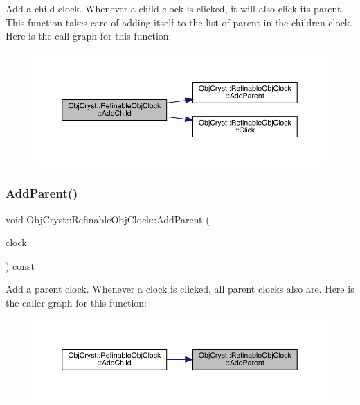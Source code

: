 Add a \textquotesingle{}child\textquotesingle{} clock. Whenever a child clock is clicked, it will also click its parent. This function takes care of adding itself to the list of parent in the children clock. Here is the call graph for this function\+:
\nopagebreak
\begin{figure}[H]
\begin{center}
\leavevmode
\includegraphics[width=350pt]{class_obj_cryst_1_1_refinable_obj_clock_a4be5b7b2f802d67000098a89939ffaf1_cgraph}
\end{center}
\end{figure}
\mbox{\label{class_obj_cryst_1_1_refinable_obj_clock_a56dadfe83111cdbc37da80cc19185e9a}} 
\subsubsection{\texorpdfstring{AddParent()}{AddParent()}}
{\footnotesize\ttfamily void Obj\+Cryst\+::\+Refinable\+Obj\+Clock\+::\+Add\+Parent (\begin{DoxyParamCaption}\item[{\mbox{\hyperlink{class_obj_cryst_1_1_refinable_obj_clock}{Refinable\+Obj\+Clock}} \&}]{clock }\end{DoxyParamCaption}) const}

Add a \textquotesingle{}parent\textquotesingle{} clock. Whenever a clock is clicked, all parent clocks also are. Here is the caller graph for this function\+:
\nopagebreak
\begin{figure}[H]
\begin{center}
\leavevmode
\includegraphics[width=350pt]{class_obj_cryst_1_1_refinable_obj_clock_a56dadfe83111cdbc37da80cc19185e9a_icgraph}
\end{center}
\end{figure}
\mbox{\label{class_obj_cryst_1_1_refinable_obj_clock_a980b7dc70decc75c58eba0a55d73fc6d}} 
